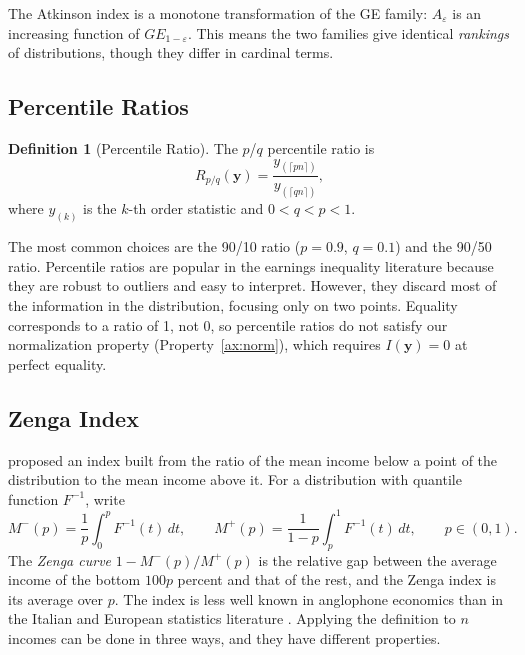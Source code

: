 \documentclass[12pt]{article}
\theoremstyle{plain}
\theoremstyle{definition}
\newtheorem{definition}[theorem]{Definition}
\theoremstyle{remark}
\newcommand{\bfy}{\mathbf{y}}
\begin{document}
The Atkinson index is a monotone transformation of the GE family: $A_\varepsilon$ is an increasing function of $GE_{1-\varepsilon}$.
This means the two families give identical \emph{rankings} of distributions, though they differ in cardinal terms.

\subsection{Percentile Ratios}\label{sec:percentile}

\begin{definition}[Percentile Ratio]
The $p$/$q$ percentile ratio is
\begin{equation}\label{eq:pq}
R_{p/q}(\bfy) = \frac{y_{(\lceil pn \rceil)}}{y_{(\lceil qn \rceil)}},
\end{equation}
where $y_{(k)}$ is the $k$-th order statistic and $0 < q < p < 1$.
\end{definition}

The most common choices are the 90/10 ratio ($p = 0.9$, $q = 0.1$) and the 90/50 ratio.
Percentile ratios are popular in the earnings inequality literature because they are robust to outliers and easy to interpret.
However, they discard most of the information in the distribution, focusing only on two points.
Equality corresponds to a ratio of 1, not 0, so percentile ratios do not satisfy our normalization property (Property~\ref{ax:norm}), which requires $I(\bfy) = 0$ at perfect equality.

\subsection{Zenga Index}\label{sec:zenga}

\citet{Zenga2007} proposed an index built from the ratio of the mean income below a point of the distribution to the mean income above it.
For a distribution with quantile function $F^{-1}$, write
\begin{equation}\label{eq:zenga_star_means}
M^{-}(p) = \frac{1}{p}\int_0^p F^{-1}(t)\,dt, \qquad M^{+}(p) = \frac{1}{1-p}\int_p^1 F^{-1}(t)\,dt, \qquad p \in (0,1).
\end{equation}
The \emph{Zenga curve} $1 - M^{-}(p)/M^{+}(p)$ is the relative gap between the average income of the bottom $100p$ percent and that of the rest, and the Zenga index is its average over $p$.
The index is less well known in anglophone economics than in the Italian and European statistics literature \citep{Greselin2010,Greselin2013,Langel2012}.
Applying the definition to $n$ incomes can be done in three ways, and they have different properties.
\end{document}
